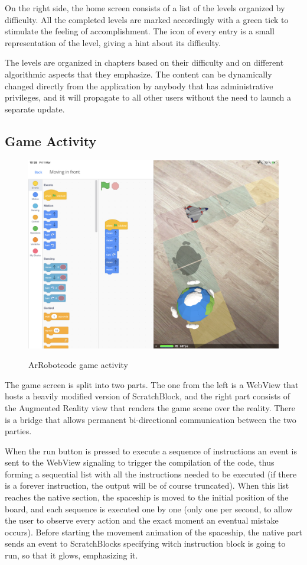 \documentclass[12 pct]{report}
\begin{document}
On the right side, the home screen consists of a list of the levels organized by difficulty. All the completed levels are marked accordingly with a green tick to stimulate the feeling of accomplishment. The icon of every entry is a small representation of the level, giving a hint about its difficulty. 

The levels are organized in chapters based on their difficulty and on different algorithmic aspects that they emphasize. The content can be dynamically changed directly from the application by anybody that has administrative privileges, and it will propagate to all other users without the need to launch a separate update.


\subsection*{Game Activity}
\begin{figure}[H]
\includegraphics[width=1.0\textwidth]{ArRobotCode2}
\centering
\label{fig:hololens}
\caption{ArRobotcode game activity}
\end{figure}
The game screen is split into two parts. The one from the left is a WebView \cite{hazarika2014recommendations} that hosts a heavily modified version of ScratchBlock, and the right part consists of the Augmented Reality view that renders the game scene over the reality. There is a bridge that allows permanent bi-directional communication between the two parties.

When the run button is pressed to execute a sequence of instructions an event is sent to the WebView signaling to trigger the compilation of the code, thus forming a sequential list with all the instructions needed to be executed (if there is a forever instruction, the output will be of course truncated). When this list reaches the native section, the spaceship is moved to the initial position of the board, and each sequence is executed one by one (only one per second, to allow the user to observe every action and the exact moment an eventual mistake occurs). Before starting the movement animation of the spaceship, the native part sends an event to ScratchBlocks specifying witch instruction block is going to run, so that it glows, emphasizing it.
\end{document}
